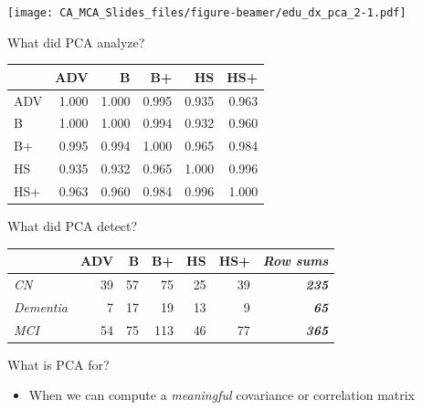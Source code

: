 \documentclass[
  ignorenonframetext,
]{beamer}
\providecommand{\tightlist}{%
  \setlength{\itemsep}{0pt}\setlength{\parskip}{0pt}}
\begin{document}
\begin{frame}

\texttt{[image: CA\_MCA\_Slides\_files/figure-beamer/edu\_dx\_pca\_2-1.pdf]}

\end{frame}

\begin{frame}{What did PCA analyze?}
\protect\hypertarget{what-did-pca-analyze}{}

\begin{table}[H]
\centering
\begin{tabular}{lrrrrr}
\toprule
  & ADV & B & B+ & HS & HS+\\
\midrule
ADV & 1.000 & 1.000 & 0.995 & 0.935 & 0.963\\
B & 1.000 & 1.000 & 0.994 & 0.932 & 0.960\\
B+ & 0.995 & 0.994 & 1.000 & 0.965 & 0.984\\
HS & 0.935 & 0.932 & 0.965 & 1.000 & 0.996\\
HS+ & 0.963 & 0.960 & 0.984 & 0.996 & 1.000\\
\bottomrule
\end{tabular}
\end{table}

\end{frame}

\begin{frame}{What did PCA detect?}
\protect\hypertarget{what-did-pca-detect-1}{}

\begin{table}[H]
\centering
\begin{tabular}{>{\em}lrrrrr>{\bfseries\em}r}
\toprule
  & ADV & B & B+ & HS & HS+ & Row sums\\
\midrule
CN & 39 & 57 & 75 & 25 & 39 & 235\\
Dementia & 7 & 17 & 19 & 13 & 9 & 65\\
MCI & 54 & 75 & 113 & 46 & 77 & 365\\
\bottomrule
\end{tabular}
\end{table}

\end{frame}

\begin{frame}{What is PCA for?}
\protect\hypertarget{what-is-pca-for-1}{}

\begin{itemize}[<+->]
\tightlist
\item
  When we can compute a \emph{meaningful} covariance or correlation
  matrix
\end{itemize}

\end{frame}
\end{document}
